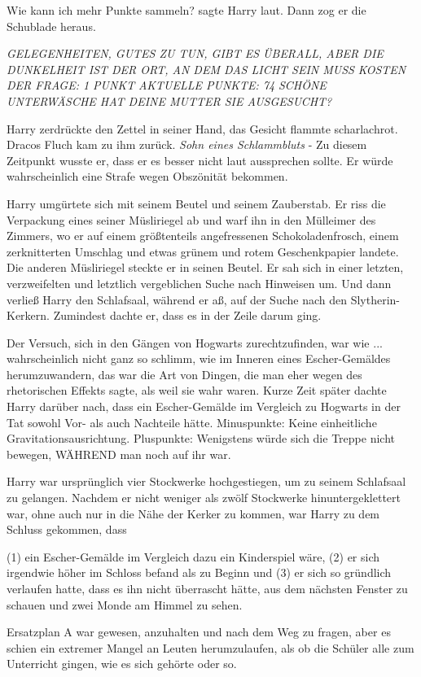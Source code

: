 \glqq{}Wie kann ich mehr Punkte sammeln?\grqq{} sagte Harry laut. Dann zog er die
Schublade heraus.

\emph{GELEGENHEITEN, GUTES ZU TUN, GIBT ES ÜBERALL, ABER DIE DUNKELHEIT IST DER
ORT, AN DEM DAS LICHT SEIN MUSS} \emph{KOSTEN DER FRAGE: 1 PUNKT}
\emph{AKTUELLE PUNKTE: 74} \emph{SCHÖNE UNTERWÄSCHE HAT DEINE MUTTER SIE
AUSGESUCHT?}

Harry zerdrückte den Zettel in seiner Hand, das Gesicht flammte scharlachrot.
Dracos Fluch kam zu ihm zurück. \emph{Sohn eines Schlammbluts} - Zu diesem
Zeitpunkt wusste er, dass er es besser nicht laut aussprechen sollte. Er würde
wahrscheinlich eine Strafe wegen Obszönität bekommen.

Harry umgürtete sich mit seinem Beutel und seinem Zauberstab. Er riss die
Verpackung eines seiner Müsliriegel ab und warf ihn in den Mülleimer des
Zimmers, wo er auf einem größtenteils angefressenen Schokoladenfrosch, einem
zerknitterten Umschlag und etwas grünem und rotem Geschenkpapier landete. Die
anderen Müsliriegel steckte er in seinen Beutel. Er sah sich in einer letzten,
verzweifelten und letztlich vergeblichen Suche nach Hinweisen um. Und dann
verließ Harry den Schlafsaal, während er aß, auf der Suche nach den
Slytherin-Kerkern. Zumindest dachte er, dass es in der Zeile darum ging.

Der Versuch, sich in den Gängen von Hogwarts zurechtzufinden, war wie ...
wahrscheinlich nicht ganz so schlimm, wie im Inneren eines Escher-Gemäldes
herumzuwandern, das war die Art von Dingen, die man eher wegen des rhetorischen
Effekts sagte, als weil sie wahr waren. Kurze Zeit später dachte Harry darüber
nach, dass ein Escher-Gemälde im Vergleich zu Hogwarts in der Tat sowohl Vor-
als auch Nachteile hätte. Minuspunkte: Keine einheitliche
Gravitationsausrichtung. Pluspunkte: Wenigstens würde sich die Treppe nicht
bewegen, WÄHREND man noch auf ihr war.

Harry war ursprünglich vier Stockwerke hochgestiegen, um zu seinem Schlafsaal zu
gelangen. Nachdem er nicht weniger als zwölf Stockwerke hinuntergeklettert war,
ohne auch nur in die Nähe der Kerker zu kommen, war Harry zu dem Schluss
gekommen, dass

(1) ein Escher-Gemälde im Vergleich dazu ein Kinderspiel wäre, (2) er sich
irgendwie höher im Schloss befand als zu Beginn und (3) er sich so gründlich
verlaufen hatte, dass es ihn nicht überrascht hätte, aus dem nächsten Fenster zu
schauen und zwei Monde am Himmel zu sehen.

Ersatzplan A war gewesen, anzuhalten und nach dem Weg zu fragen, aber es schien
ein extremer Mangel an Leuten herumzulaufen, als ob die Schüler alle zum
Unterricht gingen, wie es sich gehörte oder so.

